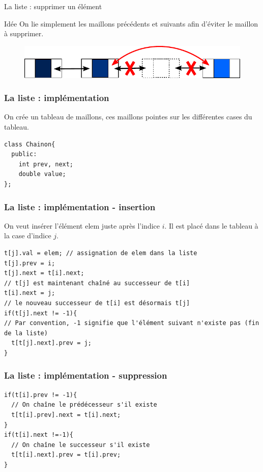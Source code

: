 \documentclass{beamer}
\begin{document}
\begin{frame}{La liste : supprimer un élément}
\begin{block}{Idée}
On lie simplement les maillons précédents et suivants afin d'éviter le maillon à supprimer.
\end{block}

\begin{figure}
\centering
\includegraphics[width=0.9 \linewidth]{./images/liste03.pdf}
\end{figure}
\end{frame}

\begin{frame}[fragile]
\frametitle{La liste : implémentation}
On crée un tableau de maillons, ces maillons pointes sur les différentes cases du tableau.
\begin{verbatim}
class Chainon{
  public:
    int prev, next;
    double value;
};
\end{verbatim}
\end{frame}

\begin{frame}[fragile]
\frametitle{La liste : implémentation - insertion}
On veut insérer l'élément $\text{elem}$ juste après l'indice $i$. Il est placé dans le tableau à la case d'indice $j$.
\begin{verbatim}
t[j].val = elem; // assignation de elem dans la liste
t[j].prev = i;
t[j].next = t[i].next;
// t[j] est maintenant chaîné au successeur de t[i]
t[i].next = j;
// le nouveau successeur de t[i] est désormais t[j]
if(t[j].next != -1){
// Par convention, -1 signifie que l'élément suivant n'existe pas (fin de la liste)
  t[t[j].next].prev = j;
}
\end{verbatim}
\end{frame}

\begin{frame}[fragile]
\frametitle{La liste : implémentation - suppression}
\begin{verbatim}
if(t[i].prev != -1){
  // On chaîne le prédécesseur s'il existe
  t[t[i].prev].next = t[i].next;
}
if(t[i].next !=-1){
  // On chaîne le successeur s'il existe
  t[t[i].next].prev = t[i].prev;
}
\end{verbatim}
\end{frame}
\end{document}
